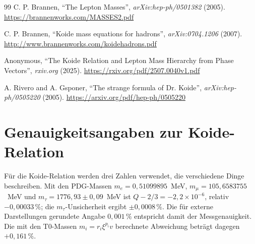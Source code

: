 \begin{thebibliography}{99}
		C. P. Brannen, ``The Lepton Masses'', \textit{arXiv:hep-ph/0501382} (2005).
		\url{https://brannenworks.com/MASSES2.pdf}
		
		C. P. Brannen, ``Koide mass equations for hadrons'', \textit{arXiv:0704.1206} (2007).
		\url{http://www.brannenworks.com/koidehadrons.pdf}
		
		Anonymous, ``The Koide Relation and Lepton Mass Hierarchy from Phase Vectors'', \textit{rxiv.org} (2025).
		\url{https://rxiv.org/pdf/2507.0040v1.pdf}
		
		A. Rivero and A. Gsponer, ``The strange formula of Dr. Koide'', \textit{arXiv:hep-ph/0505220} (2005).
		\url{https://arxiv.org/pdf/hep-ph/0505220}
		
	\end{thebibliography}
	
\section*{Genauigkeitsangaben zur Koide-Relation}

Für die Koide-Relation werden drei Zahlen verwendet, die verschiedene Dinge beschreiben.
Mit den PDG-Massen $m_e = 0{,}51099895$~MeV, $m_\mu = 105{,}6583755$~MeV und
$m_\tau = 1776{,}93 \pm 0{,}09$~MeV ist $Q - 2/3 = -2{,}2\times10^{-6}$, relativ
$-0{,}00033\,\%$; die $m_\tau$-Unsicherheit ergibt $\pm 0{,}0008\,\%$. Die für externe
Darstellungen gerundete Angabe $0{,}001\,\%$ entspricht damit der Messgenauigkeit.
Die mit den T0-Massen $m_i = r_i\xi^{p_i}v$ berechnete Abweichung beträgt dagegen $+0{,}161\,\%$.
